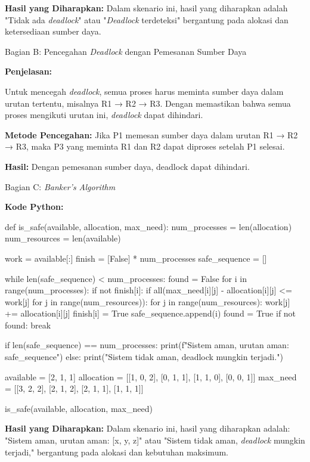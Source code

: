 \documentclass[12pt]{article}
\begin{document}
\textbf{Hasil yang Diharapkan:} Dalam skenario ini, hasil yang diharapkan adalah "Tidak ada \textit{deadlock}" atau "\textit{Deadlock} terdeteksi" bergantung pada alokasi dan ketersediaan sumber daya.

Bagian B: Pencegahan \textit{Deadlock} dengan Pemesanan Sumber Daya

\textbf{Penjelasan:}

Untuk mencegah \textit{deadlock}, semua proses harus meminta sumber daya dalam urutan tertentu, misalnya R1 → R2 → R3. Dengan memastikan bahwa semua proses mengikuti urutan ini, \textit{deadlock} dapat dihindari.

\textbf{Metode Pencegahan:}
Jika P1 memesan sumber daya dalam urutan R1 → R2 → R3, maka P3 yang meminta R1 dan R2 dapat diproses setelah P1 selesai.

\textbf{Hasil:}
Dengan pemesanan sumber daya, deadlock dapat dihindari.

Bagian C: \textit{Banker's Algorithm}

\textbf{Kode Python:}

\begin{python}
def is_safe(available, allocation, max_need):
    num_processes = len(allocation)
    num_resources = len(available)
    
    work = available[:]
    finish = [False] * num_processes
    safe_sequence = []

    while len(safe_sequence) < num_processes:
        found = False
        for i in range(num_processes):
            if not finish[i]:
                if all(max_need[i][j] - allocation[i][j] <= work[j] for j in range(num_resources)):
                    for j in range(num_resources):
                        work[j] += allocation[i][j]
                    finish[i] = True
                    safe_sequence.append(i)
                    found = True
        if not found:
            break

    if len(safe_sequence) == num_processes:
        print(f"Sistem aman, urutan aman: {safe_sequence}")
    else:
        print("Sistem tidak aman, deadlock mungkin terjadi.")

available = [2, 1, 1]
allocation = [[1, 0, 2], [0, 1, 1], [1, 1, 0], [0, 0, 1]]
max_need = [[3, 2, 2], [2, 1, 2], [2, 1, 1], [1, 1, 1]]

is_safe(available, allocation, max_need)
\end{python}

\textbf{Hasil yang Diharapkan:} Dalam skenario ini, hasil yang diharapkan adalah: "Sistem aman, urutan aman: [x, y, z]" atau "Sistem tidak aman, \textit{deadlock} mungkin terjadi," bergantung pada alokasi dan kebutuhan maksimum.
\end{document}
